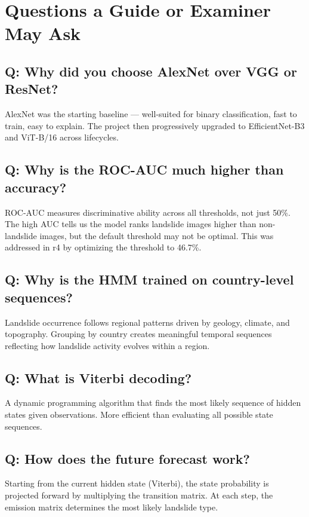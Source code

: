 \documentclass[11pt]{article}
\begin{document}
\section{Questions a Guide or Examiner May Ask}

\subsection{Q: Why did you choose AlexNet over VGG or ResNet?}
AlexNet was the starting baseline --- well-suited for binary classification, fast to train, easy to explain. The project then progressively upgraded to EfficientNet-B3 and ViT-B/16 across lifecycles.

\subsection{Q: Why is the ROC-AUC much higher than accuracy?}
ROC-AUC measures discriminative ability across all thresholds, not just 50\%. The high AUC tells us the model ranks landslide images higher than non-landslide images, but the default threshold may not be optimal. This was addressed in r4 by optimizing the threshold to 46.7\%.

\subsection{Q: Why is the HMM trained on country-level sequences?}
Landslide occurrence follows regional patterns driven by geology, climate, and topography. Grouping by country creates meaningful temporal sequences reflecting how landslide activity evolves within a region.

\subsection{Q: What is Viterbi decoding?}
A dynamic programming algorithm that finds the most likely sequence of hidden states given observations. More efficient than evaluating all possible state sequences.

\subsection{Q: How does the future forecast work?}
Starting from the current hidden state (Viterbi), the state probability is projected forward by multiplying the transition matrix. At each step, the emission matrix determines the most likely landslide type.
\end{document}

